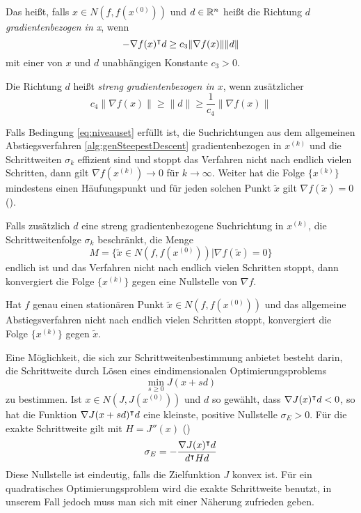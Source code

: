 Das heißt, falls $x\in N(f,f(x^{(0)}))$ und $d\in \mathbb{R}^n$ heißt die Richtung $d$ \textit{gradientenbezogen in x}, wenn
 \[
  -\nabla f(x)^\intercal d\geq c_3\|\nabla f(x)\| \|d\|
 \]
mit einer von $x$ und $d$ unabhängigen Konstante $c_3>0$.

Die Richtung $d$ heißt \textit{streng gradientenbezogen in $x$}, wenn zusätzlicher 
\[
 c_4\|\nabla f(x)\| \geq \|d\| \geq \frac{1}{c_4}\|\nabla f(x)\| 
\]


 Falls Bedingung \eqref{eq:niveauset} erfüllt ist, die Suchrichtungen aus dem allgemeinen Abstiegsverfahren \ref{alg:genSteepestDescent} gradientenbezogen in $x^{(k)}$ und die Schrittweiten $\sigma_k$ effizient sind und stoppt das Verfahren nicht nach endlich vielen Schritten, dann gilt $\nabla f(x^{(k)})\to 0$ für $k\to \infty$. Weiter hat die Folge $\{x^{(k)}\}$ mindestens einen Häufungspunkt und für jeden solchen Punkt $\tilde x$ gilt $\nabla f(\tilde x) = 0$ (\cite[Satz 4.4.9]{alt2002nichtlineare}).

Falls zusätzlich $d$ eine streng gradientenbezogene Suchrichtung in $x^{(k)}$, die Schrittweitenfolge $\sigma_k$ beschränkt, die Menge 
$$M = \{\tilde x\in N(f,f(x^{(0)}))|\nabla f(\tilde x)=0\}$$ endlich ist und das Verfahren nicht nach endlich vielen Schritten stoppt, dann konvergiert die Folge $\{x^{(k)}\}$ gegen eine Nullstelle von $\nabla f$.

Hat $f$ genau einen stationären Punkt $\tilde x \in N(f,f(x^{(0)}))$ und das allgemeine Abstiegsverfahren nicht nach endlich vielen Schritten stoppt, konvergiert die Folge $\{x^{(k)}\}$ gegen $\tilde x$.
 
Eine Möglichkeit, die sich zur Schrittweitenbestimmung anbietet besteht darin, die Schrittweite durch Lösen eines eindimensionalen Optimierungsproblems
\[
 \min_{s\geq 0} J(x+sd)
\]
zu bestimmen. Ist $x\in N(J,J(x^{(0)}))$ und $d$ so gewählt, dass $\nabla J(x)^\intercal d <0$, so hat die Funktion $\nabla J(x+sd)^\intercal d$ eine kleinste, positive Nullstelle $\sigma_E>0$. Für die exakte Schrittweite gilt mit $H = J''(x)$ (\cite[Gleichung (4.5.5)]{alt2002nichtlineare})
\[
 \sigma_E = -\frac{\nabla J(x)^\intercal d}{d^\intercal H d}
\]
Diese Nullstelle ist eindeutig, falls die Zielfunktion $J$ konvex ist. Für ein quadratisches Optimierungsproblem wird die exakte Schrittweite benutzt, in unserem Fall jedoch muss man sich mit einer Näherung zufrieden geben. 
 
